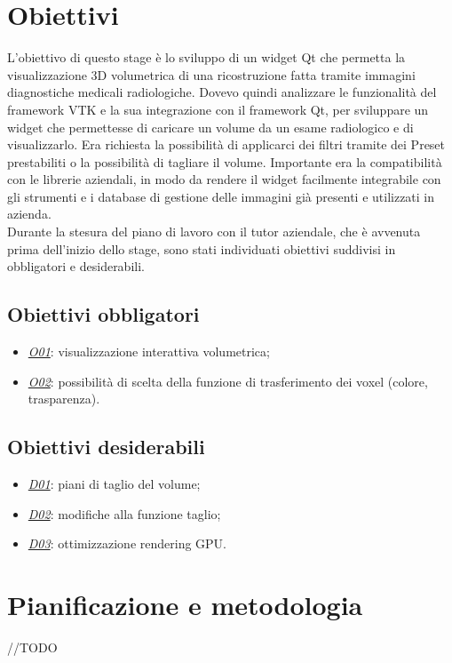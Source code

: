 \section{Obiettivi}
L'obiettivo di questo stage è lo sviluppo di un widget Qt che permetta la visualizzazione 3D volumetrica di una ricostruzione fatta tramite immagini diagnostiche medicali radiologiche. Dovevo quindi analizzare le funzionalità del framework VTK e la sua integrazione con il framework Qt, per sviluppare un widget che permettesse di caricare un volume da un esame radiologico e di visualizzarlo. Era richiesta la possibilità di applicarci dei filtri tramite dei Preset prestabiliti o la possibilità di tagliare il volume.
Importante era la compatibilità con le librerie aziendali, in modo da rendere il widget facilmente integrabile con gli strumenti e i database di gestione delle immagini già presenti e utilizzati in azienda.\\
Durante la stesura del piano di lavoro con il tutor aziendale, che è avvenuta prima dell’inizio dello stage, sono stati individuati obiettivi suddivisi in obbligatori e desiderabili.

\subsection{Obiettivi obbligatori}\label{sec:obiettivi-obbligatori}
\begin{itemize}
\item \underline{\textit{O01}}: visualizzazione interattiva volumetrica;
\item \underline{\textit{O02}}: possibilità di scelta della funzione di trasferimento dei voxel (colore, trasparenza).
\end{itemize}

\subsection{Obiettivi desiderabili}\label{sec:obiettivi-desiderabili}
\begin{itemize}
\item \underline{\textit{D01}}: piani di taglio del volume;
\item \underline{\textit{D02}}: modifiche alla funzione taglio;
\item \underline{\textit{D03}}: ottimizzazione rendering GPU.
\end{itemize}

\section{Pianificazione e metodologia}
//TODO


